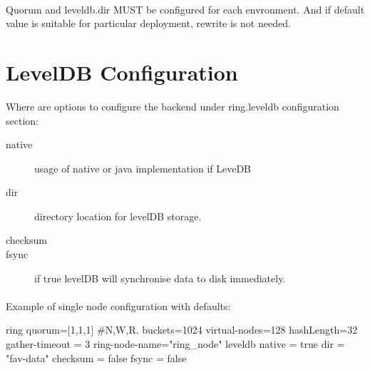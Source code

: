 \paragraph{}
Quorum and leveldb.dir MUST be configured for each envronment.
And if default value is suitable for particular deployment, rewrite is not needed.

\section{LevelDB Configuration}
Where are options to configure the backend under ring.leveldb configuration section:
\begin{description}
\item[native] usage of native or java implementation if LeveDB
\item[dir] directory location for levelDB storage.
\item[checksum]
\item[fsync] if true levelDB will synchronise data to disk immediately.
\end{description}

\paragraph{}
Example of single node configuration with defaults:

\begin{json}
ring{
  quorum=[1,1,1]  #N,W,R.
  buckets=1024
  virtual-nodes=128
  hashLength=32
  gather-timeout = 3
  ring-node-name="ring_node"
  leveldb {
    native = true
    dir = "fav-data"
    checksum = false
    fsync = false
  }
}
\end{json}
